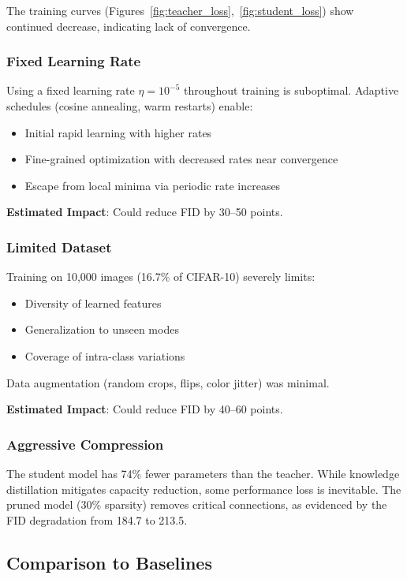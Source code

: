\documentclass[12pt]{report}
\theoremstyle{definition}
\begin{document}
The training curves (Figures~\ref{fig:teacher_loss},~\ref{fig:student_loss}) show continued decrease, indicating lack of convergence.

\subsubsection{Fixed Learning Rate}

Using a fixed learning rate $\eta = 10^{-5}$ throughout training is suboptimal. Adaptive schedules (cosine annealing, warm restarts) enable:
\begin{itemize}
\item Initial rapid learning with higher rates
\item Fine-grained optimization with decreased rates near convergence
\item Escape from local minima via periodic rate increases
\end{itemize}

\textbf{Estimated Impact}: Could reduce FID by 30--50 points.

\subsubsection{Limited Dataset}

Training on 10,000 images (16.7\% of CIFAR-10) severely limits:
\begin{itemize}
\item Diversity of learned features
\item Generalization to unseen modes
\item Coverage of intra-class variations
\end{itemize}

Data augmentation (random crops, flips, color jitter) was minimal.

\textbf{Estimated Impact}: Could reduce FID by 40--60 points.

\subsubsection{Aggressive Compression}

The student model has 74\% fewer parameters than the teacher. While knowledge distillation mitigates capacity reduction, some performance loss is inevitable. The pruned model (30\% sparsity) removes critical connections, as evidenced by the FID degradation from 184.7 to 213.5.

\subsection{Comparison to Baselines}
\end{document}
